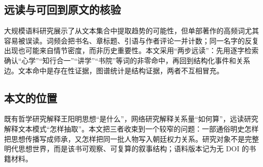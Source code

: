 \subsection{远读与可回到原文的核验}

大规模语料研究展示了从文本集合中提取趋势的可能性\cite{michel2011}，但单部著作的高频词尤其容易被误读。词频会把书名、章标题、引语与作者评论一并计数；同一名字的反复出现也可能来自情节密度，而非历史重要性。本文采用“两步远读”：先用逐字检索确认“心学”“知行合一”“讲学”“书院”等词的非零命中，再回到结构化事件和关系边。文本命中是存在性证据，图谱统计是结构证据，两者不互相冒充。

\subsection{本文的位置}

既有哲学研究解释王阳明思想“是什么”，网络研究解释关系量“如何算”，远读研究解释文本模式“怎样抽取”。本文把三者收束到一个较窄的问题：一部通俗明史怎样把思想传播写成师承，又怎样把同一批人物写入朝廷权力关系。研究对象不是完整明代思想世界，而是该书可观察、可复算的叙事结构；语料版本记为无 DOI 的书籍材料\cite{dangnian2009}。

